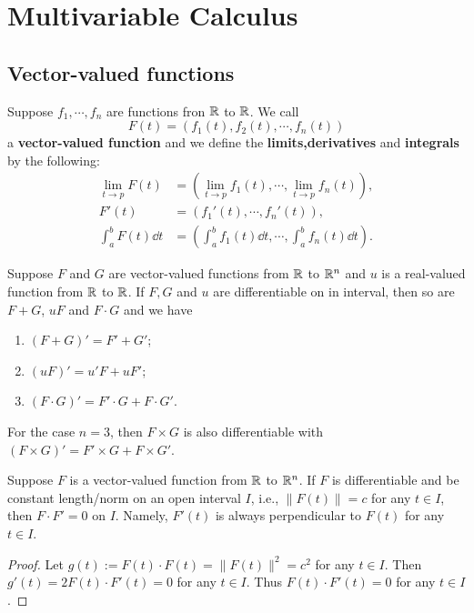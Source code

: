 \documentclass[a4paper]{ctexart}
\begin{document}
    \newpage
    \section{Multivariable Calculus}
    \subsection{Vector-valued functions}
    \begin{mydef}
        Suppose $f_1,\cdots,f_n$ are functions fron $\mathbb{R}$ to $\mathbb{R}$. We call $$F(t) = (f_1(t), f_2(t), \cdots, f_n(t))$$ a \textbf{vector-valued function} and we define the \textbf{limits,derivatives} and \textbf{integrals} by the following:
        $$ \begin{aligned}
            \lim_{t\to p} F(t) &= \left( \lim_{t\to p} f_1(t), \cdots, \lim_{t\to p} f_n(t) \right),\\
            F'(t) &= (f_1'(t), \cdots, f_n'(t)),\\
            \int_a^b F(t) \dd t &= \left( \int_a^b f_1(t) \dd t, \cdots, \int_a^b f_n(t) \dd t \right).
        \end{aligned} $$
    \end{mydef}
    \begin{mythm}
        Suppose $F$ and $G$ are vector-valued functions from $\mathbb{R}$ to $\mathbb{R}^n$ and $u$ is a real-valued function from $\mathbb{R}$ to $\mathbb{R}$. If $F,G$ and $u$ are differentiable on in interval, then so are $F+G$, $uF$ and $F\cdot G$ and we have
        \begin{enumerate}[label=(\arabic*)]
            \item $(F+G)' = F' + G'$;
            \item $(uF)' = u' F + u F'$;
            \item $(F\cdot G)' = F'\cdot G + F\cdot G'$.
        \end{enumerate}
        For the case $n=3$, then $F\times G$ is also differentiable with $(F\times G)' = F'\times G + F \times G'$.
    \end{mythm}
    \begin{mypro}
        Suppose $F$ is a vector-valued function from $\mathbb{R}$ to $\mathbb{R}^n$. If $F$ is differentiable and be constant length/norm on an open interval $I$, i.e., $\| F(t)\| = c$ for any $t\in I$, then $F \cdot F' = 0$ on $I$. Namely, $F'(t)$ is always perpendicular to $F(t)$ for any $t\in I$.
    \end{mypro}
    \begin{proof}
        Let $g(t) := F(t)\cdot F(t) = \| F(t)\|^2 = c^2$ for any $t\in I$. Then $g'(t) = 2 F(t)\cdot F'(t) = 0$ for any $t\in I$. Thus $F(t)\cdot F'(t) = 0$ for any $t\in I$.
    \end{proof}
\end{document}
